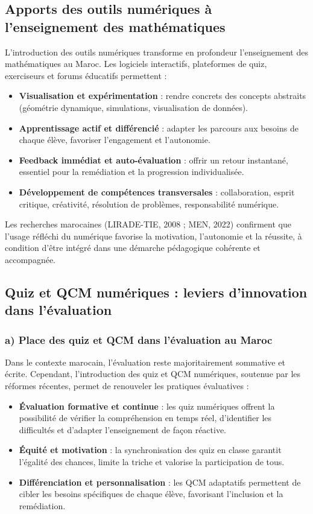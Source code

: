 \documentclass[a4paper,11pt]{report}
\begin{document}
\subsection{Apports des outils numériques à l'enseignement des mathématiques}
L'introduction des outils numériques transforme en profondeur l'enseignement des mathématiques au Maroc. Les logiciels interactifs, plateformes de quiz, exerciseurs et forums éducatifs permettent :
\begin{itemize}
    \item \textbf{Visualisation et expérimentation} : rendre concrets des concepts abstraits (géométrie dynamique, simulations, visualisation de données).
    \item \textbf{Apprentissage actif et différencié} : adapter les parcours aux besoins de chaque élève, favoriser l'engagement et l'autonomie.
    \item \textbf{Feedback immédiat et auto-évaluation} : offrir un retour instantané, essentiel pour la remédiation et la progression individualisée.
    \item \textbf{Développement de compétences transversales} : collaboration, esprit critique, créativité, résolution de problèmes, responsabilité numérique.
\end{itemize}
Les recherches marocaines (LIRADE-TIE, 2008 ; MEN, 2022) confirment que l'usage réfléchi du numérique favorise la motivation, l'autonomie et la réussite, à condition d'être intégré dans une démarche pédagogique cohérente et accompagnée.

\subsection{Quiz et QCM numériques : leviers d'innovation dans l'évaluation}
\subsubsection*{a) Place des quiz et QCM dans l'évaluation au Maroc}
Dans le contexte marocain, l'évaluation reste majoritairement sommative et écrite. Cependant, l'introduction des quiz et QCM numériques, soutenue par les réformes récentes, permet de renouveler les pratiques évaluatives :
\begin{itemize}
    \item \textbf{Évaluation formative et continue} : les quiz numériques offrent la possibilité de vérifier la compréhension en temps réel, d'identifier les difficultés et d'adapter l'enseignement de façon réactive.
    \item \textbf{Équité et motivation} : la synchronisation des quiz en classe garantit l'égalité des chances, limite la triche et valorise la participation de tous.
    \item \textbf{Différenciation et personnalisation} : les QCM adaptatifs permettent de cibler les besoins spécifiques de chaque élève, favorisant l'inclusion et la remédiation.
\end{itemize}
\end{document}
